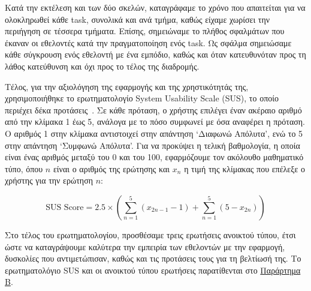 Κατά την εκτέλεση και των δύο σκελών, καταγράφαμε το χρόνο που απαιτείται για να ολοκληρωθεί κάθε task, συνολικά και ανά τμήμα, καθώς είχαμε χωρίσει την περιήγηση σε τέσσερα τμήματα. Επίσης, σημειώναμε το πλήθος σφαλμάτων που έκαναν οι εθελοντές κατά την πραγματοποίηση ενός task. Ως σφάλμα σημειώσαμε κάθε σύγκρουση ενός εθελοντή με ένα εμπόδιο, καθώς και όταν κατευθυνόταν προς τη λάθος κατεύθυνση και όχι προς το τέλος της διαδρομής.

Τέλος, για την αξιολόγηση της εφαρμογής και της χρηστικότητάς της, χρησιμοποιήθηκε το ερωτηματολογίο System Usability Scale (SUS), το οποίο περιέχει δέκα προτάσεις~\cite{brooke_1995_sus}. Σε κάθε πρόταση, ο χρήστης επιλέγει έναν ακέραιο αριθμό από την κλίμακα 1 έως 5, ανάλογα με το πόσο συμφωνεί με όσα αναφέρει η πρόταση. Ο αριθμός 1 στην κλίμακα αντιστοιχεί στην απάντηση `Διαφωνώ Απόλυτα', ενώ το 5 στην απάντηση `Συμφωνώ Απόλυτα'. Για να προκύψει η τελική βαθμολογία, η οποία είναι ένας αριθμός μεταξύ του 0 και του 100, εφαρμόζουμε τον ακόλουθο μαθηματικό τύπο, όπου $n$ είναι ο αριθμός της ερώτησης και $x_n$ η τιμή της κλίμακας που επέλεξε ο χρήστης για την ερώτηση $n$:

\[
  \text{SUS Score} = 2.5 \times ( \sum_{n=1}^{5}(x_{2n - 1} - 1) + \sum_{n=1}^{5}(5 - x_{2n}))
\]

Στο τέλος του ερωτηματολογίου, προσθέσαμε τρεις ερωτήσεις ανοικτού τύπου, έτσι ώστε να καταγράψουμε καλύτερα την εμπειρία των εθελοντών με την εφαρμογή, δυσκολίες που αντιμετώπισαν, καθώς και τις προτάσεις τους για τη βελτίωσή της. Το ερωτηματολόγιο SUS και οι ανοικτού τύπου ερωτήσεις παρατίθενται στο \hyperref[ch:appendixB]{Παράρτημα Β}.

